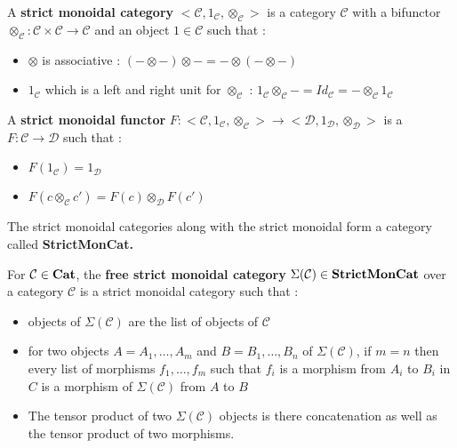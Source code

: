 \documentclass{report}
\begin{document}
\begin{defn}
    A \textbf{strict monoidal category}\cite{lane_1971} $\big<\mathcal{C},1_\mathcal{C},\otimes_\mathcal{C}\big>$ is a category $\mathcal{C}$ with a bifunctor $\otimes_\mathcal{C} : \mathcal{C}\times\mathcal{C} \rightarrow \mathcal{C}$ and an object $1\in\mathcal{C}$ such that :
    \begin{itemize}
        \item $\otimes$ is associative : $(-\otimes-)\otimes - = - \otimes (-\otimes-)$
        \item $1_\mathcal{C}$ which is a left and right unit for $\otimes_\mathcal{C}$ : $1_\mathcal{C}\otimes_\mathcal{C} - = Id_{\mathcal{C}} = - \otimes_\mathcal{C} 1_\mathcal{C}$
    \end{itemize}
    \label{strict-mon}
\end{defn}

\begin{defn}
    A \textbf{strict monoidal functor}
    $F : \big<\mathcal{C},1_\mathcal{C},\otimes_\mathcal{C}\big> \rightarrow \big<\mathcal{D},1_\mathcal{D},\otimes_\mathcal{D}\big>$ 
    is a $F : \mathcal{C} \rightarrow \mathcal{D}$ such that :
    \begin{itemize}
        \item $F(1_\mathcal{C}) = 1_\mathcal{D}$
        \item $F(c\otimes_\mathcal{C} c') = F(c)\otimes_\mathcal{D}F(c') $ 
    \end{itemize}
    \label{strict-mon_func}
\end{defn}

\begin{defn}[StrictMonCat]
    The strict monoidal categories along with the strict monoidal form a category called \bf StrictMonCat\cite{katsumata_2014}.
    \label{SrictMonCat}
\end{defn}

\begin{defn}
    For $\mathcal{C} \in \bf Cat$, the \textbf{free strict monoidal category} $ \Sigma (\mathcal{C})\in \bf StrictMonCat$ over a category $\mathcal{C}$ is a strict monoidal category such that :
    \begin{itemize}
        \item objects of $\Sigma (\mathcal{C})$ are the list of objects of $\mathcal{C}$
        \item for two objects $A = A_1,\dots,A_m$ and $B = B_1,\dots,B_n$ of $\Sigma (\mathcal{C})$, if $m = n$ then every list of morphisms $f_1,\dots,f_m$ such that $f_i$ is a morphism from $A_i$ to $B_i$ in $C$ is a morphism of $\Sigma(\mathcal{C})$ from $A$ to $B$
        \item The tensor product of two $\Sigma(\mathcal{C})$ objects is there concatenation as well as the tensor product of two morphisms.
    \end{itemize}
\end{defn}
\end{document}
